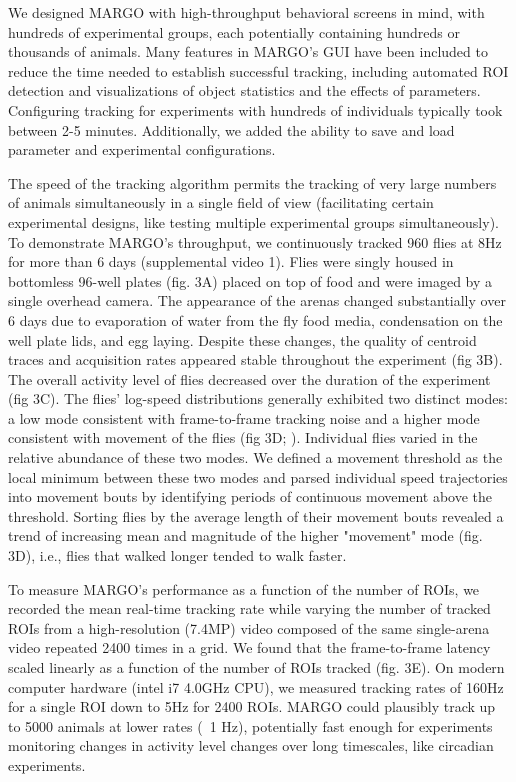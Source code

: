 \documentclass[10pt]{article}
\begin{document}
\begin{multicols}{2}
We designed MARGO with high-throughput behavioral screens in mind, with hundreds of experimental groups, each potentially containing hundreds or thousands of animals. Many features in MARGO's GUI have been included to reduce the time needed to establish successful tracking, including automated ROI detection and visualizations of object statistics and the effects of parameters. Configuring tracking for experiments with hundreds of individuals typically took between 2-5 minutes. Additionally, we added the ability to save and load parameter and experimental configurations.

The speed of the tracking algorithm permits the tracking of very large numbers of animals simultaneously in a single field of view (facilitating certain experimental designs, like testing multiple experimental groups simultaneously). To demonstrate MARGO's throughput, we continuously tracked 960 flies at 8Hz for more than 6 days (supplemental video 1). Flies were singly housed in bottomless 96-well plates (fig. 3A) placed on top of food and were imaged by a single overhead camera. The appearance of the arenas changed substantially over 6 days due to evaporation of water from the fly food media, condensation on the well plate lids, and egg laying. Despite these changes, the quality of centroid traces and acquisition rates appeared stable throughout the experiment (fig 3B). The overall activity level of flies decreased over the duration of the experiment (fig 3C). The flies' log-speed distributions generally exhibited two distinct modes: a low mode consistent with frame-to-frame tracking noise and a higher mode consistent with movement of the flies (fig 3D; \cite{berman_choi_bialek_shaevitz_2014,Crall_2016_cockroach}). Individual flies varied in the relative abundance of these two modes. We defined a movement threshold as the local minimum between these two modes and parsed individual speed trajectories into movement bouts by identifying periods of continuous movement above the threshold. Sorting flies by the average length of their movement bouts revealed a trend of increasing mean and magnitude of the higher "movement" mode (fig. 3D), i.e., flies that walked longer tended to walk faster.

To measure MARGO's performance as a function of the number of ROIs, we recorded the mean real-time tracking rate while varying the number of tracked ROIs from a high-resolution (7.4MP) video composed of the same single-arena video repeated 2400 times in a grid. We found that the frame-to-frame latency scaled linearly as a function of the number of ROIs tracked (fig. 3E). On modern computer hardware (intel i7 4.0GHz CPU), we measured tracking rates of 160Hz for a single ROI down to 5Hz for 2400 ROIs. MARGO could plausibly track up to 5000 animals at lower rates (~1 Hz), potentially fast enough for experiments monitoring changes in activity level changes over long timescales, like circadian experiments.


\end{multicols}
\end{document}
